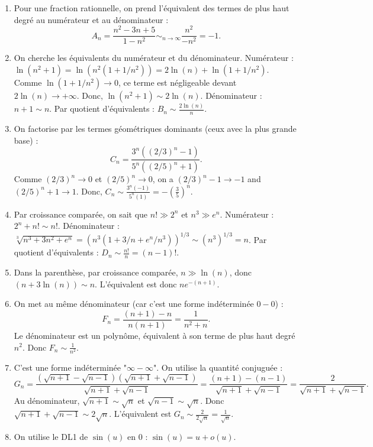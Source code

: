 \documentclass[solutions]{exercices}
\begin{document}
\begin{solution}
	\begin{enumerate}[label=${\Alph*}_n)$]
		\item Pour une fraction rationnelle, on prend l'équivalent des termes de plus haut degré au numérateur et au dénominateur :
		      \[ A_n = \frac{n^2-3n+5}{1-n^2} \sim_{n\to\infty} \frac{n^2}{-n^2} = -1. \]
		\item On cherche les équivalents du numérateur et du dénominateur.
		      Numérateur : $\ln(n^2+1) = \ln(n^2(1+1/n^2)) = 2\ln(n) + \ln(1+1/n^2)$. Comme $\ln(1+1/n^2) \to 0$, ce terme est négligeable devant $2\ln(n) \to +\infty$. Donc, $\ln(n^2+1) \sim 2\ln(n)$.
		      Dénominateur : $n+1 \sim n$.
		      Par quotient d'équivalents : $ B_n \sim \frac{2\ln(n)}{n} $.
		\item On factorise par les termes géométriques dominants (ceux avec la plus grande base) :
		      \[ C_n = \frac{3^n((2/3)^n - 1)}{5^n((2/5)^n + 1)}. \]
		      Comme $(2/3)^n \to 0$ et $(2/5)^n \to 0$, on a $(2/3)^n - 1 \to -1$ and $(2/5)^n + 1 \to 1$.
		      Donc, $C_n \sim \frac{3^n(-1)}{5^n(1)} = -\left(\frac{3}{5}\right)^n$.
		\item Par croissance comparée, on sait que $n! \gg 2^n$ et $n^3 \gg e^n$.
		      Numérateur : $2^n + n! \sim n!$.
		      Dénominateur : $\sqrt[3]{n^3 + 3n^2 + e^n} = (n^3(1+3/n+e^n/n^3))^{1/3} \sim (n^3)^{1/3} = n$.
		      Par quotient d'équivalents : $ D_n \sim \frac{n!}{n} = (n-1)! $.
		\item Dans la parenthèse, par croissance comparée, $n \gg \ln(n)$, donc $(n+3\ln(n)) \sim n$. L'équivalent est donc $n e^{-(n+1)}$.
		\item On met au même dénominateur (car c'est une forme indéterminée $0-0$) :
		      \[ F_n = \frac{(n+1)-n}{n(n+1)} = \frac{1}{n^2+n}. \]
		      Le dénominateur est un polynôme, équivalent à son terme de plus haut degré $n^2$. Donc $ F_n \sim \frac{1}{n^2} $.
		\item C'est une forme indéterminée "$\infty-\infty$". On utilise la quantité conjuguée :
		      \[ G_n = \frac{(\sqrt{n+1} - \sqrt{n-1})(\sqrt{n+1} + \sqrt{n-1})}{\sqrt{n+1}+\sqrt{n-1}} = \frac{(n+1)-(n-1)}{\sqrt{n+1}+\sqrt{n-1}} = \frac{2}{\sqrt{n+1}+\sqrt{n-1}}. \]
		      Au dénominateur, $\sqrt{n+1} \sim \sqrt{n}$ et $\sqrt{n-1} \sim \sqrt{n}$. Donc $\sqrt{n+1}+\sqrt{n-1} \sim 2\sqrt{n}$. L'équivalent est $ G_n \sim \frac{2}{2\sqrt{n}} = \frac{1}{\sqrt{n}} $.
		\item On utilise le DL1 de $\sin(u)$ en $0$ : $\sin(u) = u + o(u)$.

\end{enumerate}
\end{solution}
\end{document}
